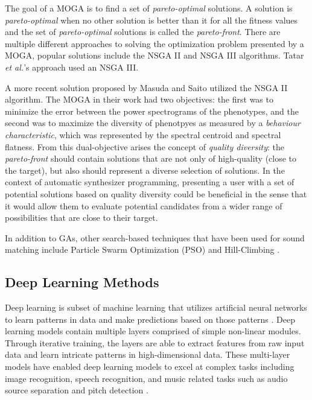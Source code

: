 The goal of a MOGA is to find a set of \textit{pareto-optimal} solutions. A solution is \textit{pareto-optimal} when no other solution is better than it for all the fitness values and the set of \textit{pareto-optimal} solutions is called the \textit{pareto-front}. There are multiple different approaches to solving the optimization problem presented by a MOGA, popular solutions include the NSGA II \cite{deb2002fast} and NSGA III \cite{deb2013evolutionary} algorithms. Tatar \textit{et al.}'s approach used an NSGA III. 

A more recent solution proposed by Masuda and Saito \cite{masudo2021quality} utilized the NSGA II algorithm. The MOGA in their work had two objectives: the first was to minimize the error between the power spectrograms of the phenotypes, and the second was to maximize the diversity of phenotpyes as measured by a \textit{behaviour characteristic}, which was represented by the spectral centroid and spectral flatness. From this dual-objective arises the concept of \textit{quality diversity}: the \textit{pareto-front} should contain solutions that are not only of high-quality (close to the target), but also should represent a diverse selection of solutions. In the context of automatic synthesizer programming, presenting a user with a set of potential solutions based on quality diversity could be beneficial in the sense that it would allow them to evaluate potential candidates from a wider range of possibilities that are close to their target.


In addition to GAs, other search-based techniques that have been used for sound matching include Particle Swarm Optimization (PSO) \cite{heise2009automatic} and Hill-Climbing \cite{roth2011comparison, luke2019stochastic}.

\subsection{Deep Learning Methods}
Deep learning is subset of machine learning that utilizes artificial neural networks to learn patterns in data and make predictions based on those patterns \cite{lecun2015deep}. Deep learning models contain multiple layers comprised of simple non-linear modules. Through iterative training, the layers are able to extract features from raw input data and learn intricate patterns in high-dimensional data. These multi-layer models have enabled deep learning models to excel at complex tasks including image recognition, speech recognition, and music related tasks such as audio source separation \cite{spleeter2019} and pitch detection \cite{kim2018crepe}.

